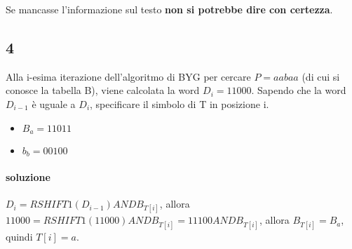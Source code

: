 Se mancasse l'informazione sul testo \textbf{non si potrebbe dire con certezza}.

\subsection{4}

Alla i-esima iterazione dell'algoritmo di BYG per cercare $P = aabaa$ (di cui si conosce la tabella B), viene calcolata la word $D_i = 11000$. Sapendo che la word $D_{i−1}$ \`e uguale a $D_i$, specificare il simbolo di T in posizione i.

\begin{itemize}
    \item $B_a = 11011$
    \item $b_b = 00100$
\end{itemize}

\paragraph{soluzione} $D_i = RSHIFT1(D_{i-1}) AND B_{T[i]}$, allora $11000 = RSHIFT1(11000) AND B_{T[i]} = 11100 AND B_{T[i]}$, allora $B_{T[i]} = B_a$, quindi $T[i] = a$.
